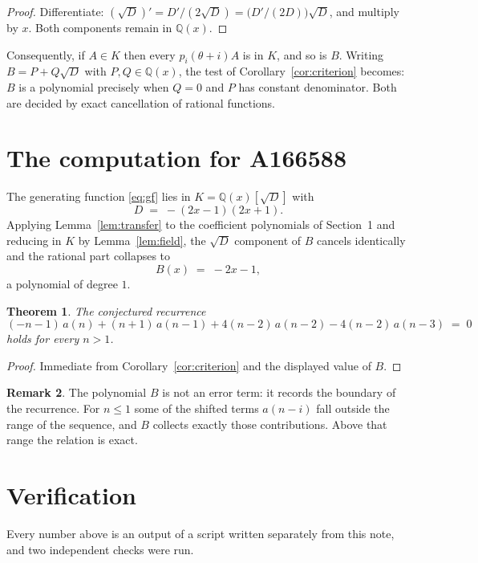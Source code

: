 \documentclass[11pt,a4paper]{article}
\theoremstyle{plain}
\newtheorem{theorem}{Theorem}
\theoremstyle{definition}
\newtheorem{remark}[theorem]{Remark}
\begin{document}
\begin{proof}
Differentiate: $(\sqrt{D})'=D'/(2\sqrt{D})=\bigl(D'/(2D)\bigr)\sqrt{D}$, and multiply by
$x$. Both components remain in $\mathbb{Q}(x)$.
\end{proof}

Consequently, if $A\in K$ then every $p_{i}(\theta+i)A$ is in $K$, and so is $B$. Writing
$B=P+Q\sqrt{D}$ with $P,Q\in\mathbb{Q}(x)$, the test of Corollary~\ref{cor:criterion}
becomes: $B$ is a polynomial precisely when $Q=0$ and $P$ has constant denominator. Both
are decided by exact cancellation of rational functions.

\section{The computation for A166588}

The generating function \eqref{eq:gf} lies in $K=\mathbb{Q}(x)[\sqrt{D}]$ with
\[
D \;=\; - \left(2 x - 1\right) \left(2 x + 1\right) .
\]
Applying Lemma~\ref{lem:transfer} to the coefficient polynomials of Section~1 and reducing
in $K$ by Lemma~\ref{lem:field}, the $\sqrt{D}$ component of $B$ cancels identically and
the rational part collapses to
\[
B(x)\;=\;- 2 x - 1 ,
\]
a polynomial of degree $1$.

\begin{theorem}
The conjectured recurrence
\[
(- n - 1)\,a(n) + (n + 1)\,a(n-1) + 4 \left(n - 2\right)\,a(n-2) -  4 \left(n - 2\right)\,a(n-3) \;=\;0
\]
holds for every $n>1$.
\end{theorem}

\begin{proof}
Immediate from Corollary~\ref{cor:criterion} and the displayed value of $B$.
\end{proof}

\begin{remark}
The polynomial $B$ is not an error term: it records the boundary of the recurrence. For
$n\le1$ some of the shifted terms $a(n-i)$ fall outside the range of the sequence,
and $B$ collects exactly those contributions. Above that range the relation is exact.
\end{remark}

\section{Verification}

Every number above is an output of a script written separately from this note, and two
independent checks were run.
\end{document}
